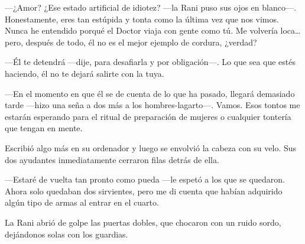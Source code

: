 ---¿Amor? ¿Ese estado artificial de idiotez? ---la Rani puso sus ojos en
blanco---. Honestamente, eres tan estúpida y tonta como la última vez
que nos vimos. Nunca he entendido porqué el Doctor viaja con gente como
tú. Me volvería loca\ldots{} pero, después de todo, él no es el mejor
ejemplo de cordura, ¿verdad?

---Él te detendrá ---dije, para desafiarla y por obligación---. Lo que
sea que estés haciendo, él no te dejará salirte con la tuya.

---En el momento en que él se de cuenta de lo que ha pasado, llegará
demasiado tarde ---hizo una seña a dos más a los hombres-lagarto---.
Vamos. Esos tontos me estarán esperando para el ritual de preparación de
mujeres o cualquier tontería que tengan en mente.

Escribió algo más en su ordenador y luego se envolvió la cabeza con su
velo. Sus dos ayudantes inmediatamente cerraron filas detrás de ella.

---Estaré de vuelta tan pronto como pueda ---le espetó a los que se
quedaron. Ahora solo quedaban dos sirvientes, pero me di cuenta que
habían adquirido algún tipo de armas al entrar en el cuarto.

La Rani abrió de golpe las puertas dobles, que chocaron con un ruido
sordo, dejándonos solas con los guardias.